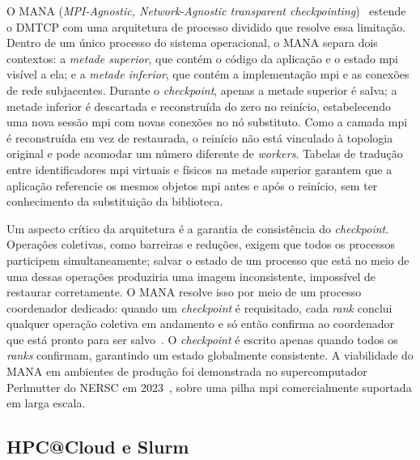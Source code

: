 \documentclass[a4paper,11pt]{article}
\begin{document}
            O MANA (\textit{MPI-Agnostic, Network-Agnostic transparent
            checkpointing})~\cite{garg2019mana,xu2023mana} estende o DMTCP com uma
            arquitetura de processo dividido que resolve essa limitação. Dentro de um
            único processo do sistema operacional, o MANA separa dois contextos: a
            \textit{metade superior}, que contém o código da aplicação e o estado
            \gls{mpi} visível a ela; e a \textit{metade inferior}, que contém a implementação
            \gls{mpi} e as conexões de rede subjacentes. Durante o \textit{checkpoint},
            apenas a metade superior é salva; a metade inferior é descartada e
            reconstruída do zero no reinício, estabelecendo uma nova sessão \gls{mpi} com
            novas conexões no nó substituto. Como a camada \gls{mpi} é reconstruída em vez
            de restaurada, o reinício não está vinculado à topologia original e pode
            acomodar um número diferente de \textit{workers}. Tabelas de tradução
            entre identificadores \gls{mpi} virtuais e físicos na metade superior garantem que
            a aplicação referencie os mesmos objetos \gls{mpi} antes e após o reinício, sem
            ter conhecimento da substituição da biblioteca.

            Um aspecto crítico da arquitetura é a garantia de consistência do
            \textit{checkpoint}. Operações coletivas, como barreiras e reduções, exigem
            que todos os processos participem simultaneamente; salvar o estado de um
            processo que está no meio de uma dessas operações produziria uma imagem
            inconsistente, impossível de restaurar corretamente. O MANA resolve isso
            por meio de um processo coordenador dedicado: quando um \textit{checkpoint}
            é requisitado, cada \textit{rank} conclui qualquer operação coletiva em
            andamento e só então confirma ao coordenador que está pronto para ser
            salvo~\cite{garg2019mana,xu2024mana}. O \textit{checkpoint} é escrito
            apenas quando todos os \textit{ranks} confirmam, garantindo um estado
            globalmente consistente. A viabilidade do MANA em ambientes de produção
            foi demonstrada no supercomputador Perlmutter do NERSC em
            2023~\cite{xu2023mana}, sobre uma pilha \gls{mpi} comercialmente suportada
            em larga escala.

        \subsection{HPC@Cloud e Slurm}
\end{document}
